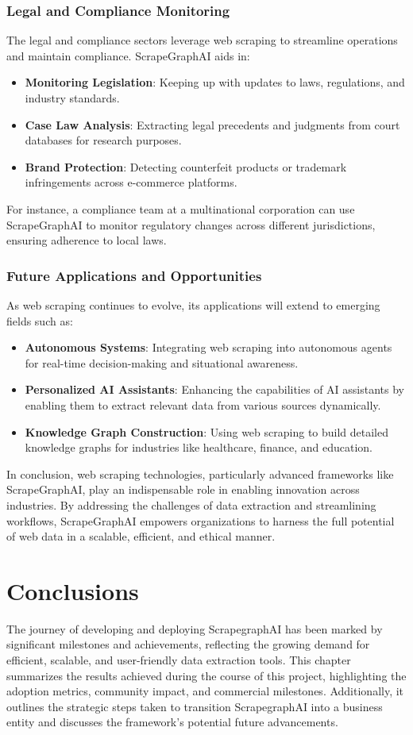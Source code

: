 \subsection{Legal and Compliance Monitoring}
The legal and compliance sectors leverage web scraping to streamline operations and maintain compliance. ScrapeGraphAI aids in:
\begin{itemize}
    \item \textbf{Monitoring Legislation}: Keeping up with updates to laws, regulations, and industry standards.
    \item \textbf{Case Law Analysis}: Extracting legal precedents and judgments from court databases for research purposes.
    \item \textbf{Brand Protection}: Detecting counterfeit products or trademark infringements across e-commerce platforms.
\end{itemize}
For instance, a compliance team at a multinational corporation can use ScrapeGraphAI to monitor regulatory changes across different jurisdictions, ensuring adherence to local laws.

\subsection{Future Applications and Opportunities}
As web scraping continues to evolve, its applications will extend to emerging fields such as:
\begin{itemize}
    \item \textbf{Autonomous Systems}: Integrating web scraping into autonomous agents for real-time decision-making and situational awareness.
    \item \textbf{Personalized AI Assistants}: Enhancing the capabilities of AI assistants by enabling them to extract relevant data from various sources dynamically.
    \item \textbf{Knowledge Graph Construction}: Using web scraping to build detailed knowledge graphs for industries like healthcare, finance, and education.
\end{itemize}

In conclusion, web scraping technologies, particularly advanced frameworks like ScrapeGraphAI, play an indispensable role in enabling innovation across industries. By addressing the challenges of data extraction and streamlining workflows, ScrapeGraphAI empowers organizations to harness the full potential of web data in a scalable, efficient, and ethical manner.


\chapter{Conclusions}
The journey of developing and deploying ScrapegraphAI has been marked by significant milestones and achievements, reflecting the growing demand for efficient, scalable, and user-friendly data extraction tools. This chapter summarizes the results achieved during the course of this project, highlighting the adoption metrics, community impact, and commercial milestones. Additionally, it outlines the strategic steps taken to transition ScrapegraphAI into a business entity and discusses the framework's potential future advancements.

